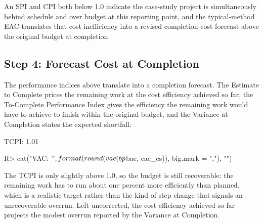 \documentclass[
]{jss}
\begin{document}
An SPI and CPI both below 1.0 indicate the case-study project is
simultaneously behind schedule and over budget at this reporting point,
and the typical-method EAC translates that cost inefficiency into a
revised completion-cost forecast above the original budget at
completion.

\subsection{Step 4: Forecast Cost at
Completion}\label{step-4-forecast-cost-at-completion}

The performance indices above translate into a completion forecast. The
Estimate to Complete prices the remaining work at the cost efficiency
achieved so far, the To-Complete Performance Index gives the efficiency
the remaining work would have to achieve to finish within the original
budget, and the Variance at Completion states the expected shortfall:

\begin{CodeChunk}
\begin{CodeOutput}
TCPI: 1.01 
\end{CodeOutput}
\begin{CodeInput}
R> cat("VAC:  $", format(round(vac(bp$bac, eac_cs)), big.mark = ","), "\n")
\end{CodeInput}
\end{CodeChunk}

The TCPI is only slightly above 1.0, so the budget is still recoverable:
the remaining work has to run about one percent more efficiently than
planned, which is a realistic target rather than the kind of step change
that signals an unrecoverable overrun. Left uncorrected, the cost
efficiency achieved so far projects the modest overrun reported by the
Variance at Completion.
\end{document}
